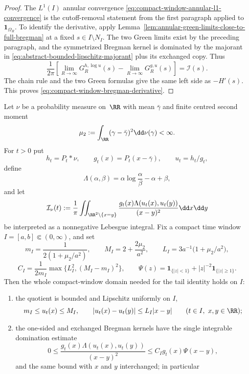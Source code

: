 \begin{proof}
The \(L^1(I)\) annular convergence
\eqref{eq:compact-window-annular-l1-convergence} is the cutoff-removal
statement from the first paragraph applied to \(\mathbf1_{\Omega_R}\).  To
identify the derivative, apply
Lemma~\ref{lem:annular-green-limits-close-to-full-bregman} at a fixed
\(s\in I\setminus N_I\).  The two Green limits exist by the preceding
paragraph, and the symmetrized Bregman kernel is dominated by the majorant in
\eqref{eq:abstract-bounded-lipschitz-majorant} plus its exchanged copy.  Thus
\[
\frac1{2\pi}
\left[
\lim_{R\to\infty}G_R^{h,\log u}(s)
-\lim_{R\to\infty}G_R^{g,u}(s)
\right]
=\mathscr I(s).
\]
The chain rule and the two Green formulas give the same left side as
\(-H'(s)\).  This proves \eqref{eq:compact-window-bregman-derivative}.
\end{proof}

\begin{proposition}%
\label{prop:main-C-domain-differentiation-package}
Let \(\nu\) be a probability measure on~\(\RR\) with mean \(\bar\gamma\) and
finite centred second moment
\[
\mu_2:=\int_{\RR}(\gamma-\bar\gamma)^2\dd\nu(\gamma)<\infty .
\]
For \(t>0\) put
\[
h_t=P_t*\nu,\qquad
g_t(x)=P_t(x-\bar\gamma),\qquad
u_t=h_t/g_t,
\]
define
\[
\Lambda(\alpha,\beta)=\alpha\log\frac{\alpha}{\beta}-\alpha+\beta,
\]
and let
\[
\mathcal I_\nu(t):=\frac1\pi\iint_{\RR^2\setminus\{x=y\}}
\frac{g_t(x)\Lambda(u_t(x),u_t(y))}{(x-y)^2}\dd x\dd y
\]
be interpreted as a nonnegative Lebesgue integral.  Fix a compact time
window \(I=[a,b]\Subset(0,\infty)\), and set
\[
m_I=\frac1{2(1+\mu_2/a^2)},\qquad
M_I=2+\frac{2\mu_2}{a^2},\qquad
L_I=3a^{-1}\bigl(1+\mu_2/a^2\bigr),
\]
\[
C_I=\frac{1}{2m_I}\max\{L_I^2,(M_I-m_I)^2\},
\qquad
\Psi(z)=\mathbf1_{\{|z|<1\}}+|z|^{-2}\mathbf1_{\{|z|\ge1\}} .
\]
Then the whole compact-window domain needed for the tail identity holds on
\(I\):
\begin{enumerate}
\item the quotient is bounded and Lipschitz uniformly on \(I\),
\[
m_I\le u_t(x)\le M_I,\qquad
|u_t(x)-u_t(y)|\le L_I|x-y|
\qquad(t\in I,\ x,y\in\RR);
\]
\item the one-sided and exchanged Bregman kernels have the single integrable
domination estimate
\begin{equation}\label{eq:main-C-domain-package-domination}
0\le
\frac{g_t(x)\Lambda(u_t(x),u_t(y))}{(x-y)^2}
\le C_I g_t(x)\Psi(x-y),
\end{equation}
and the same bound with \(x\) and \(y\) interchanged; in particular

\end{enumerate}
\end{proposition}
